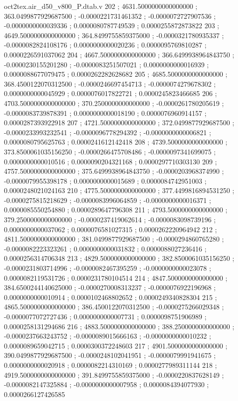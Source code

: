 \begin{filecontents}[overwrite]{oct2tex.air_d50_v800_P.dtab.v}
202 ; 4631.5000000000000000 ; 363.0499877929687500 ; -0.0000221731461352 ; -0.0000072727907536 ; -0.0000000000039336 ; 0.0000080787749539 ; 0.0000255872873822
203 ; 4649.5000000000000000 ; 364.8499755859375000 ; -0.0000321780935337 ; -0.0000082824108176 ; 0.0000000000020236 ; 0.0000095769810287 ; 0.0000226591037062
204 ; 4667.5000000000000000 ; 366.6499938964843750 ; -0.0000230155201280 ; -0.0000083251507021 ; 0.0000000000016939 ; 0.0000088677079475 ; 0.0000262282628682
205 ; 4685.5000000000000000 ; 368.4500122070312500 ; -0.0000246697454713 ; -0.0000074279678302 ; 0.0000000000045929 ; 0.0000076017822721 ; 0.0000245823466685
206 ; 4703.5000000000000000 ; 370.2500000000000000 ; -0.0000261780205619 ; -0.0000083739878391 ; 0.0000000000018190 ; 0.0000076960914157 ; 0.0000287393922918
207 ; 4721.5000000000000000 ; 372.0499877929687500 ; -0.0000233993232541 ; -0.0000096778294392 ; -0.0000000000006821 ; 0.0000080795625763 ; 0.0000241612142418
208 ; 4739.5000000000000000 ; 373.8500061035156250 ; -0.0000266475708486 ; -0.0000097341699075 ; 0.0000000000010516 ; 0.0000090204321168 ; 0.0000297710303130
209 ; 4757.5000000000000000 ; 375.6499938964843750 ; -0.0000203968374990 ; -0.0000079955398178 ; 0.0000000000015689 ; 0.0000084742951003 ; 0.0000248021024163
210 ; 4775.5000000000000000 ; 377.4499816894531250 ; -0.0000275815218629 ; -0.0000083996064859 ; -0.0000000000016371 ; 0.0000085550254880 ; 0.0000289647796308
211 ; 4793.5000000000000000 ; 379.2500000000000000 ; -0.0000237419062614 ; -0.0000083098739196 ; 0.0000000000037062 ; 0.0000076581027315 ; 0.0000262220964942
212 ; 4811.5000000000000000 ; 381.0499877929687500 ; -0.0000294860765280 ; -0.0000082223323261 ; 0.0000000000031832 ; 0.0000088027236416 ; 0.0000256314706348
213 ; 4829.5000000000000000 ; 382.8500061035156250 ; -0.0000231803714996 ; -0.0000082467395259 ; -0.0000000000023078 ; 0.0000082119531726 ; 0.0000231780104514
214 ; 4847.5000000000000000 ; 384.6500244140625000 ; -0.0000270008313237 ; -0.0000076922196968 ; 0.0000000000010914 ; 0.0000102468802652 ; 0.0000249340828304
215 ; 4865.5000000000000000 ; 386.4500122070312500 ; -0.0000275266029348 ; -0.0000077072727436 ; 0.0000000000007731 ; 0.0000098751906989 ; 0.0000258131294686
216 ; 4883.5000000000000000 ; 388.2500000000000000 ; -0.0000237663243752 ; -0.0000089015666163 ; -0.0000000000010232 ; 0.0000089659042715 ; 0.0000300372248603
217 ; 4901.5000000000000000 ; 390.0499877929687500 ; -0.0000248102041951 ; -0.0000079991941675 ; 0.0000000000020918 ; 0.0000082214310169 ; 0.0000277989311144
218 ; 4919.5000000000000000 ; 391.8499755859375000 ; -0.0000220837628149 ; -0.0000082147325884 ; -0.0000000000007958 ; 0.0000084394077930 ; 0.0000266127426585

\end{filecontents}
